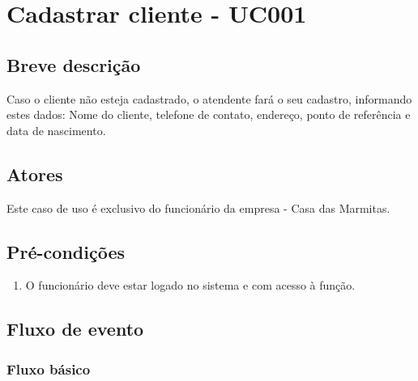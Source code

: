 \chapter{Cadastrar cliente - UC001} \label{uc001}
 
\section{Breve descrição}
 
Caso o cliente não esteja cadastrado, o atendente fará o seu cadastro, informando estes dados: Nome do cliente, telefone de contato, endereço, ponto de referência e data de nascimento.

\section{Atores}

Este caso de uso é exclusivo do funcionário da empresa - Casa das Marmitas.

\section{Pré-condições}

\begin{enumerate}
	\item O funcionário deve estar logado no sistema e com acesso à função.
\end{enumerate}

\section{Fluxo de evento}

\subsection{Fluxo básico}

